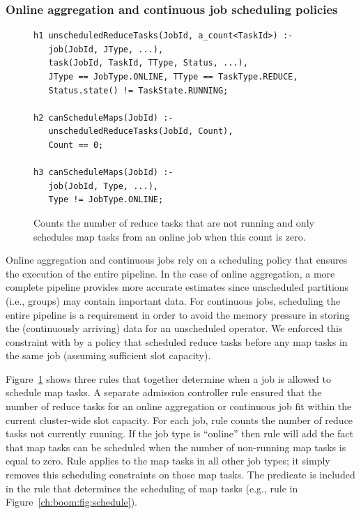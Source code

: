 \subsubsection{Online aggregation and continuous job scheduling policies}

\begin{figure}
\ssp
\centering
\begin{lstlisting}
h1 unscheduledReduceTasks(JobId, a_count<TaskId>) :-
   job(JobId, JType, ...),
   task(JobId, TaskId, TType, Status, ...),
   JType == JobType.ONLINE, TType == TaskType.REDUCE,
   Status.state() != TaskState.RUNNING;

h2 canScheduleMaps(JobId) :-
   unscheduledReduceTasks(JobId, Count),
   Count == 0;

h3 canScheduleMaps(JobId) :-
   job(JobId, Type, ...),
   Type != JobType.ONLINE;
\end{lstlisting}
\caption{\label{ch:hop:fig:schedmaps} Counts the number of reduce tasks that are not running and 
only schedules map tasks from an online job when this count is zero.}
\end{figure}

Online aggregation and continuous jobs rely on a scheduling policy that ensures
the execution of the entire pipeline.  In the case of online aggregation, a
more complete pipeline provides more accurate estimates since unscheduled
partitions (i.e., groups) may contain important data.  For continuous jobs,
scheduling the entire pipeline is a requirement in order to avoid the memory
pressure in storing the (continuously arriving) data for an unscheduled
operator.  We enforced this constraint with by a policy that scheduled reduce
tasks before any map tasks in the same job (assuming sufficient slot capacity).

Figure~\ref{ch:hop:fig:schedmaps} shows three rules that together determine
when a job is allowed to schedule map tasks.  A separate admission controller
rule ensured that the number of reduce tasks for an online aggregation or
continuous job fit within the current cluster-wide slot capacity.  For each
job, rule  counts the number of reduce tasks not currently running.  If
the job type is ``online'' then rule  will add the fact that map tasks
can be scheduled when the number of non-running map tasks is equal to zero.
Rule  applies to the map tasks in all other job types; it simply removes
this scheduling constraints on those map tasks.  The 
predicate is included in the rule that determines the scheduling of map tasks
(e.g., rule  in Figure~\ref{ch:boom:fig:schedule}).

